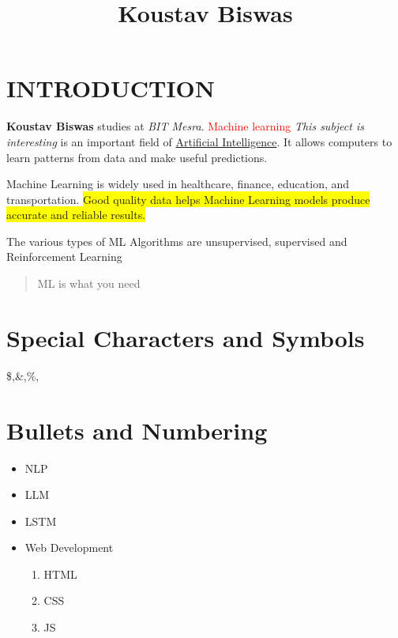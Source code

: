 \documentclass{article}
\title{Koustav Biswas}
\begin{document}
	\maketitle
	\section{INTRODUCTION}
	\textbf{Koustav Biswas} studies at \textit{BIT Mesra}.
	\textcolor{red}{Machine learning}
	\textit{This subject is \emph{interesting}}
 	is an important field of \underline{Artificial Intelligence}.
	It allows computers to learn patterns from data and make useful predictions.
	
	\textcolor{mycolor}{Machine Learning}
	 is widely used in healthcare, finance, education, and transportation.
	 \colorbox{yellow}{	Good quality data helps Machine Learning models produce accurate and reliable results.}

	The various types of ML Algorithms are {\small unsupervised},
	{\large supervised} and {\Large Reinforcement Learning}
	\begin{quote}
		\centering
		ML is what you need
	\end{quote}
	\section{Special Characters and Symbols}
	\$,\&,\%,\@@
	\section{Bullets and Numbering}
	\begin{itemize}
		\item NLP
		\item LLM
		\item LSTM
		\item Web Development
		\begin{enumerate}
			\item HTML
			\item CSS
			\item JS
		\end{enumerate}
	\end{itemize}
\end{document}
